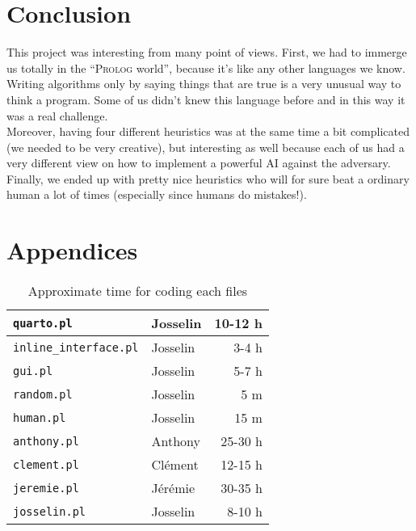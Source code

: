 \documentclass[a4paper,11pt]{article}
\newcommand{\tw}[1]{\texttt{#1}}
\newcommand{\mytable}[3]{
	\begin{table}[ht]
		\begin{center}
			\begin{tabular}{#2}
				#3
			\end{tabular}
		\caption{#1}
		\end{center}
	\end{table}
}
\begin{document}
	\section{Conclusion}
		This project was interesting from many point of views. First, we had to immerge us totally in the ``\textsc{Prolog} world'', because it's like any other languages we know. Writing algorithms only by saying things that are true is a very unusual way to think a program. Some of us didn't knew this language before and in this way it was a real challenge. \\
		Moreover, having four different heuristics was at the same time a bit complicated (we needed to be very creative), but interesting as well because each of us had a very different view on how to implement a powerful AI against the adversary. \\
		Finally, we ended up with pretty nice heuristics who will for sure beat a ordinary human a lot of times (especially since humans do mistakes!).

	\newpage
	\section{Appendices}
		\mytable{Approximate time for coding each files}{|l||l|r|}{\hline
			\tw{quarto.pl}				& Josselin		& 10-12 h	\\\hline
			\tw{inline\_interface.pl}	& Josselin		& 3-4 h		\\\hline
			\tw{gui.pl}					& Josselin		& 5-7 h		\\\hline
			\tw{random.pl}				& Josselin		& 5 m		\\\hline
			\tw{human.pl}				& Josselin		& 15 m		\\\hline
			\tw{anthony.pl}				& Anthony		& 25-30 h	\\\hline
			\tw{clement.pl}				& Clément		& 12-15 h	\\\hline
			\tw{jeremie.pl}				& Jérémie		& 30-35 h	\\\hline
			\tw{josselin.pl}			& Josselin		& 8-10 h	\\\hline
		}

\end{document}
